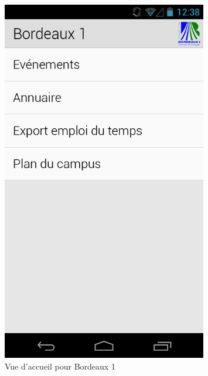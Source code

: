 \documentclass [pdftex,12pt] {report}
\begin{document}
\begin{figure}
\begin{minipage}[t]{8cm}
  \end{minipage}
  \hspace{+20pt}
  \begin{minipage}[t]{8cm}
    \centering
    \includegraphics[width=0.8\textwidth]{resources/ui_preview/02}
    \caption{Vue d'accueil pour Bordeaux 1}
    \label{fig:02}
  \end{minipage}
  \hspace{-60pt}
\end{figure}
\end{document}
